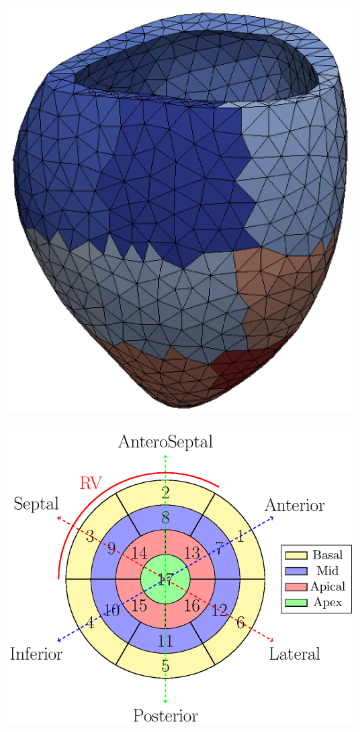 \begin{figure}[htbp]
\begin{subfigure}[t]{0.25\textwidth}
    \includegraphics[width=\textwidth, trim={15cm 4cm 21cm 3cm}, clip]{sfun}
    \caption{\label{paper1:fig:compgeo_regions}}
\end{subfigure}
\begin{subfigure}[t]{0.35\textwidth}
    \includegraphics[width=\textwidth]{bullseye}

\end{subfigure}
\end{figure}
